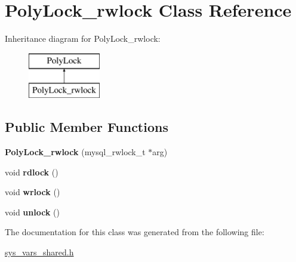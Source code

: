 \hypertarget{classPolyLock__rwlock}{}\section{Poly\+Lock\+\_\+rwlock Class Reference}
\label{classPolyLock__rwlock}
Inheritance diagram for Poly\+Lock\+\_\+rwlock\+:\begin{figure}[H]
\begin{center}
\leavevmode
\includegraphics[height=2.000000cm]{classPolyLock__rwlock}
\end{center}
\end{figure}
\subsection*{Public Member Functions}
\begin{DoxyCompactItemize}
\item 
\mbox{\label{classPolyLock__rwlock_a1724477633b5023034408e083410903d}} 
{\bfseries Poly\+Lock\+\_\+rwlock} (mysql\+\_\+rwlock\+\_\+t $\ast$arg)
\item 
\mbox{\label{classPolyLock__rwlock_a394c25ee010f1aeb37fb0966fb38bdca}} 
void {\bfseries rdlock} ()
\item 
\mbox{\label{classPolyLock__rwlock_a4e03abebcc15920cd3990dffe038c06f}} 
void {\bfseries wrlock} ()
\item 
\mbox{\label{classPolyLock__rwlock_a9f9e75334d153e56b73c60dcfd4e2740}} 
void {\bfseries unlock} ()
\end{DoxyCompactItemize}


The documentation for this class was generated from the following file\+:\begin{DoxyCompactItemize}
\item 
\mbox{\hyperlink{sys__vars__shared_8h}{sys\+\_\+vars\+\_\+shared.\+h}}\end{DoxyCompactItemize}
